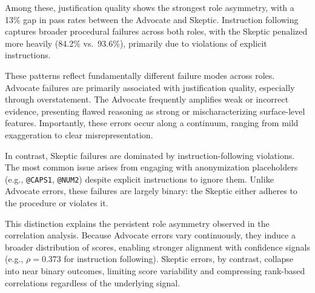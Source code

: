 \documentclass[11pt]{article}
\begin{document}
Among these, justification quality shows the strongest role asymmetry, with a 13\% gap in pass rates between the Advocate and Skeptic. Instruction following captures broader procedural failures across both roles, with the Skeptic penalized more heavily (84.2\% vs.\ 93.6\%), primarily due to violations of explicit instructions.

These patterns reflect fundamentally different failure modes across roles. Advocate failures are primarily associated with justification quality, especially through overstatement. The Advocate frequently amplifies weak or incorrect evidence, presenting flawed reasoning as strong or mischaracterizing surface-level features. Importantly, these errors occur along a continuum, ranging from mild exaggeration to clear misrepresentation. 

In contrast, Skeptic failures are dominated by instruction-following violations. The most common issue arises from engaging with anonymization placeholders (e.g., \texttt{@CAPS1}, \texttt{@NUM2}) despite explicit instructions to ignore them. Unlike Advocate errors, these failures are largely binary: the Skeptic either adheres to the procedure or violates it.

This distinction explains the persistent role asymmetry observed in the correlation analysis. Because Advocate errors vary continuously, they induce a broader distribution of scores, enabling stronger alignment with confidence signals (e.g., $\rho = 0.373$ for instruction following). Skeptic errors, by contrast, collapse into near binary outcomes, limiting score variability and compressing rank-based correlations regardless of the underlying signal.
\end{document}
